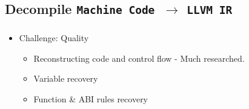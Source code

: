 \documentclass[mathserif,10pt]{beamer}
\newcommand{\cmt}[1]{}
\newcommand{\LIR}{{\tt LLVM IR}}
\newcommand{\MC}{{\tt Machine Code}}
\begin{document}
  \subsection{Decompile \MC \ $\rightarrow$ \LIR}
  \frame
  {
    \frametitle{\subsecname}
    \begin{itemize}
      \item Challenge: Quality     
      \begin{itemize}
        \item Reconstructing code and control flow - Much researched.
        \item Variable recovery
        \item Function \& ABI rules recovery
      \end{itemize}
    \end{itemize}

    \cmt{
        These methods make various trade-offs between ease of adoption, binary size,
        ease of shipping, and quality of the resulting LLVMIR, which directly
          affects the benefits that allvm provides.

          \item Diffrentiate data \& code.
          \item Indirect branch/call.
          \item Variable instruction size
          \item Position independent code (PIC) sequences
          \item Hand crafted assembly code
    }
  }
\end{document}
